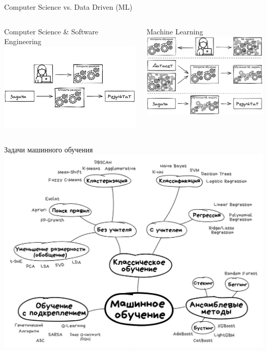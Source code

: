 \documentclass[aspectratio=169, professionalfonts]{beamer}
\begin{document}
\begin{frame}{Computer Science vs. Data Driven (ML)}
    \begin{columns}[T]
        \begin{column}{.49\linewidth}
            \centering
            Computer Science \& Software Engineering
            \includegraphics[width=\linewidth]{figures/fig2-swe.jpg}
        \end{column}
        \begin{column}{.49\linewidth}
            \centering
            Machine Learning
            \includegraphics[width=\linewidth]{figures/fig3-mle.jpg}
        \end{column}
    \end{columns}
\end{frame}

\begin{frame}{Задачи машинного обучения}
    \centering
    \includegraphics[width=.65\linewidth]{figures/fig4-tasks.jpg}
\end{frame}
\end{document}
